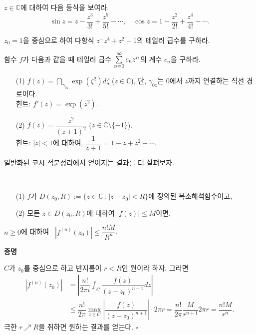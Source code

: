 \begin{salt_exercise} \label{ex-4-12}
$z\in\mathbb C$에 대하여 다음 등식을 보여라.
\[
\sin z = z - \dfrac{z^3}{3!} + \dfrac{z^5}{5!} - \cdots,
\quad
\cos z = 1 - \dfrac{z^2}{2!} + \dfrac{z^4}{4!} - \cdots.
\]
\end{salt_exercise}

\begin{salt_exercise} \label{ex-4-13}
$z_0=1$을 중심으로 하여
다항식 $z^-z^4 + z^2 -1$의 테일러 급수를 구하라.
\end{salt_exercise}

\begin{salt_exercise} \label{ex-4-14}
함수 $f$가 다음과 같을 때 테일러 급수 $\sum\limits_{n=0}^\infty c_nz^n$의 계수 $c_n$을 구하라.
\begin{itemize}
\item[(1)] $f(z) = \dint_{\gamma_{0z}} \exp(\zeta^2)d\zeta$ ($z\in\mathbb C$),
단, $\gamma_{0z}$는 $0$에서 $z$까지 연결하는 직선 경로이다. \\
힌트: $f'(z) = \exp(z^2)$.
\item[(2)] $f(z) = \dfrac{z^2}{(z+1)^2}$ ($z\in \mathbb C\setminus \{-1\}$). \\
힌트: $|z|<1$에 대하여, $\dfrac1{z+1} = 1- z + z^2 - \cdots$.
\end{itemize}
\end{salt_exercise}

일반화된 코시 적분정리에서 얻어지는 결과를 더 살펴보자.

\begin{salt_corollary}[코시 부등식] \label{coro-4-5}
\ 
\begin{itemize}
\item[(1)] $f$가 $D(z_0, R):= \{z \in \mathbb C\,:\, |z-z_0| <R \}$에 정의된
복소해석함수이고,
\item[(2)] 모든 $z\in D(z_0,R)$에 대하여 $|f(z)|\le M$이면,
\end{itemize}
$n\ge0$에 대하여  \ $|f^{(n)}(z_0)| \le \dfrac{n! M}{R^n}$.
\end{salt_corollary}

{\bf 증명}

$C$가 $z_0$를 중심으로 하고 반지름이 $r<R$인 원이라 하자. 그러면
\begin{align*}
|f^{(n)}(z_0)| &= \left| \dfrac{n!}{2\pi i} \int_C \dfrac{f(z)}{(z-z_0)^{n+1}}dz \right| \\
&\le \dfrac{n!}{2\pi} \max_{z\in C} \left| \dfrac{f(z)}{(z-z_0)^{n+1}} \right| \cdot 
2\pi r = \dfrac{n!}{2\pi} \dfrac{M}{r^{n+1}}2\pi r = \dfrac{n! M}{r^n}.
\end{align*}
극한 $r\nearrow R$을 취하면 원하는 결과를 얻는다. 
\hfill $\square$

